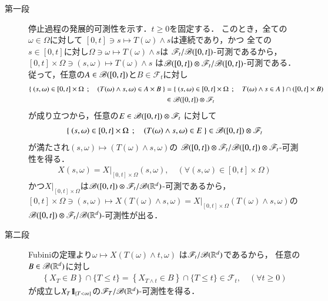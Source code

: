	\begin{prf}\mbox{}
		\begin{description}
			\item[第一段]
				停止過程の発展的可測性を示す．$t \geq 0$を固定する．
				このとき，全ての$\omega \in \Omega$に対して
				$[0,t] \ni s \longmapsto T(\omega) \wedge s$は連続であり，かつ
				全ての$s \in [0,t]$に対し$\Omega \ni \omega \longmapsto T(\omega) \wedge s$は
				$\mathscr{F}_t/\mathscr{B}([0,t])$-可測であるから，
				$[0,t] \times \Omega \ni (s,\omega) \longmapsto T(\omega) \wedge s$
				は$\mathscr{B}([0,t]) \otimes \mathscr{F}_t/\mathscr{B}([0,t])$-可測である．
				従って，任意の$A \in \mathscr{B}([0,t])$と$B \in \mathscr{F}_t$に対し
				\begin{align}
					\left\{\ (s,\omega) \in [0,t] \times \Omega\ \, ; \quad (T(\omega) \wedge s,\omega) \in A \times B\ \right\}
					&= \left\{\ (s,\omega) \in [0,t] \times \Omega\ \, ; \quad T(\omega) \wedge s \in A\ \right\}
					\cap ([0,t] \times B) \\
					&\in \mathscr{B}([0,t]) \otimes \mathscr{F}_t
				\end{align}
				が成り立つから，任意の$E \in \mathscr{B}([0,t]) \otimes \mathscr{F}_t$
				に対して
				\begin{align}
					\left\{\ (s,\omega) \in [0,t] \times \Omega\ \, ; \quad (T(\omega) \wedge s,\omega) \in E\ \right\} 
					\in \mathscr{B}([0,t]) \otimes \mathscr{F}_t
				\end{align}
				が満たされ$(s,\omega) \longmapsto (T(\omega) \wedge s,\omega)$の
				$\mathscr{B}([0,t]) \otimes \mathscr{F}_t/\mathscr{B}([0,t]) \otimes \mathscr{F}_t$-可測性を得る．
				\begin{align}
					X(s,\omega) = X|_{[0,t] \times \Omega}(s,\omega),
					\quad (\forall (s,\omega) \in [0,t] \times \Omega)
				\end{align}
				かつ$X|_{[0,t] \times \Omega}$は$\mathscr{B}([0,t]) \otimes \mathscr{F}_t/\mathscr{B}(\mathbb{R}^d)$-可測であるから，
				$[0,t] \times \Omega \ni (s,\omega) \longmapsto X(T(\omega) \wedge s,\omega) 
				= X|_{[0,t] \times \Omega}(T(\omega) \wedge s,\omega)$の
				$\mathscr{B}([0,t]) \otimes \mathscr{F}_t/\mathscr{B}(\mathbb{R}^d)$-可測性が出る．
				
			\item[第二段]
				Fubiniの定理より$\omega \longmapsto X(T(\omega) \wedge t,\omega)$
				は$\mathscr{F}_t/\mathscr{B}(\mathbb{R}^d)$であるから，
				任意の$B \in \mathscr{B}(\mathbb{R}^d)$に対し
				\begin{align}
					\left\{ X_T \in B \right\} \cap \{T \leq t\}
					= \left\{ X_{T \wedge t} \in B \right\} \cap \{T \leq t\}
					\in \mathscr{F}_t,
					\quad (\forall t \geq 0)
				\end{align}
				が成立し$X_T \mbox{1}\hspace{-0.25em}\mbox{l}_{\{T < \infty\}}$の$\mathscr{F}_T/\mathscr{B}(\mathbb{R}^d)$-可測性を得る．
				\QED
		\end{description}
	\end{prf}
	
